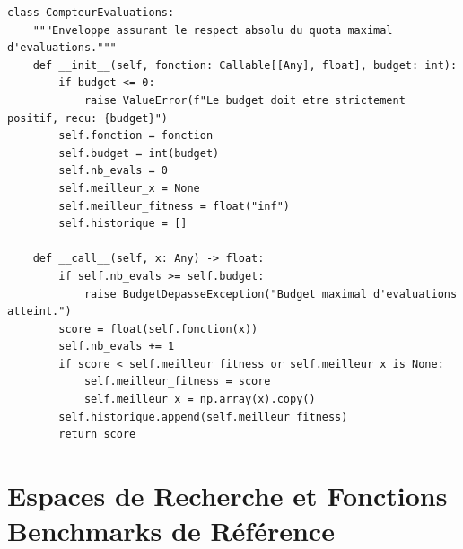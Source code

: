 \documentclass[11pt,a4paper]{article}
\begin{document}
\begin{lstlisting}[caption={Implémentation du wrapper \texttt{CompteurEvaluations} (\texttt{optim\_core.py})}, label={lst:compteur}]
class CompteurEvaluations:
    """Enveloppe assurant le respect absolu du quota maximal d'evaluations."""
    def __init__(self, fonction: Callable[[Any], float], budget: int):
        if budget <= 0:
            raise ValueError(f"Le budget doit etre strictement positif, recu: {budget}")
        self.fonction = fonction
        self.budget = int(budget)
        self.nb_evals = 0
        self.meilleur_x = None
        self.meilleur_fitness = float("inf")
        self.historique = []

    def __call__(self, x: Any) -> float:
        if self.nb_evals >= self.budget:
            raise BudgetDepasseException("Budget maximal d'evaluations atteint.")
        score = float(self.fonction(x))
        self.nb_evals += 1
        if score < self.meilleur_fitness or self.meilleur_x is None:
            self.meilleur_fitness = score
            self.meilleur_x = np.array(x).copy()
        self.historique.append(self.meilleur_fitness)
        return score
\end{lstlisting}

\section{Espaces de Recherche et Fonctions Benchmarks de Référence}
\end{document}
